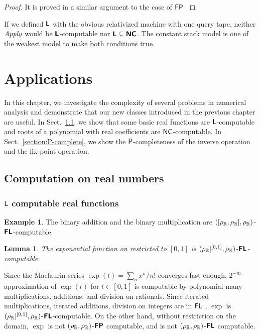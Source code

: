 \documentclass{article}
\newtheorem{lemma}[theorem]{Lemma}
\theoremstyle{definition}
\newtheorem{example}[theorem]{Example}
\theoremstyle{remark}
\begin{document}
\begin{proof}
 It is proved in a similar argument to the case of $\mathsf{FP}$ \cite{kawamura11:_funct_space_repres_and_polyn_time_comput}
\end{proof}


If we defined $\text{\bfseries \sffamily \upshape L}$ with the obvious relativized machine with one query tape,
neither $\mathit{Apply}$ would be $\text{\bfseries \sffamily \upshape L}$-computable 
nor $\text{\bfseries \sffamily \upshape L} \subseteq \text{\bfseries \sffamily \upshape NC}$.
The constant stack model is one of the weakest model to make both conditions
true.


\section{Applications}
\label{chapter:applications}
In this chapter, we investigate the complexity of several problems in numerical
analysis and demonstrate that our new classes introduced in the previous
chapter are useful.
In Sect.~\ref{section:function}, 
we show that some basic real functions are $\mathsf{L}$-computable and
roots of a polynomial with real coefficients are $\mathsf{NC}$-computable.
In Sect.~\ref{section:P-complete}, we show the $\mathsf{P}$-completeness of 
the inverse operation and the fix-point operation.

\subsection{Computation on real numbers}
\label{section:function}

\subsubsection{\texorpdfstring{$\mathsf{L}$}{L} computable real functions}

\begin{example}
 The binary addition and the binary multiplication are
 $([\rho _\mathbb R, \rho _\mathbb R], \rho _\mathbb R)$-$\text{\bfseries \sffamily \upshape FL}$-computable.
\end{example}

\begin{lemma}
 The exponential function on restricted to $[0,1]$
 is $(\rho _\mathbb R|^{[0,1]}, \rho _\mathbb R)$-$\text{\bfseries \sffamily \upshape FL}$-computable.
\end{lemma}
Since the Maclaurin series $\exp(t) = \sum_n x^n / n!$ converges fast enough,
$2^{-m}$-approximation of $\exp(t)$ for $t \in [0,1]$ is computable 
by polynomial many multiplications, additions, and division on rationals.
Since iterated multiplications, iterated additions, division on integers
are in $\mathsf{FL}$ \cite{chiu2001division},
$\exp$ is $(\rho _\mathbb R|^{[0,1]}, \rho _\mathbb R)$-$\text{\bfseries \sffamily \upshape FL}$-computable.
On the other hand, without restriction on the domain, $\exp$ is not 
$(\rho _\mathbb R, \rho _\mathbb R)$-$\text{\bfseries \sffamily \upshape FP}$ computable, 
and is not $(\rho _\mathbb R, \rho _\mathbb R)$-$\text{\bfseries \sffamily \upshape FL}$ computable.
\end{document}
